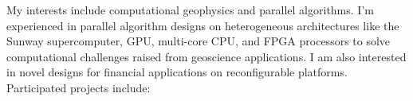 \documentclass[11pt, a4paper]{awesome-cv}
\begin{document}


\begin{cvparagraph}
My interests include computational geophysics and parallel algorithms. I'm experienced in parallel algorithm designs on heterogeneous architectures like the Sunway supercomputer, GPU, multi-core CPU, and FPGA processors to solve computational challenges raised from geoscience applications. I am also interested in novel designs for financial applications on reconfigurable platforms. Participated projects include:
\end{cvparagraph}
\end{document}
